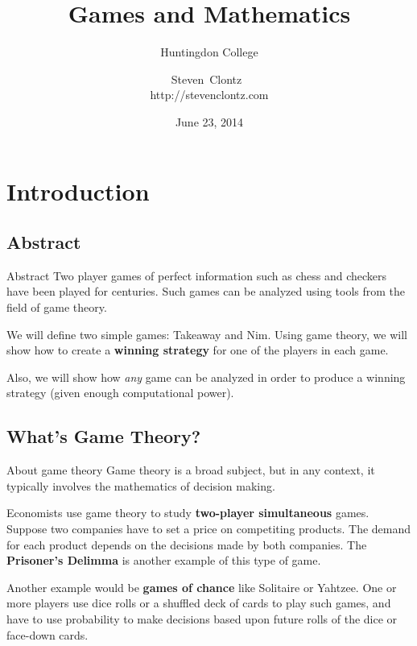 \documentclass{beamer}
\title
{Games and Mathematics}
\subtitle
{Huntingdon College} %
\author%
{Steven~Clontz~\\http://stevenclontz.com}%
\institute[Auburn University] %
{
  Department of Mathematics and Statistics\\
  Auburn University}
\date[14-06-23] %
{June 23, 2014}
\theoremstyle{theorem}
\theoremstyle{definition}
\newcommand{\<}{\langle}
\renewcommand{\>}{\rangle}
\newcommand{\vpause}{\pause\vspace{1em}}
\newcommand{\term}[1]{\textbf{#1}}
\begin{document}

\begin{frame}
  \titlepage
\end{frame}


\section{Introduction}

\subsection{Abstract}

\begin{frame}{Abstract}%
    \small
    Two player games of perfect information such as chess and checkers have
    been played for centuries. Such games can be analyzed using tools from
    the field of game theory.

    \vpause

    We will define two simple games: Takeaway and Nim.
    Using game theory, we will show how to create a \term{winning strategy}
    for one of the players in each game.

    \vpause

    Also, we will show how \textit{any} game can be analyzed in order
    to produce a winning strategy (given enough computational power).
\end{frame}

\subsection{What's Game Theory?}

\begin{frame}{About game theory}
  Game theory is a broad subject, but in any context, it typically involves the
  mathematics of decision making.

  \vpause

  Economists use game theory to study \term{two-player simultaneous}
  games. Suppose two companies have to set a price on competiting products.
  The demand for each product depends on the decisions made by both companies.
  The \term{Prisoner's Delimma} is another example of this type of game.

  \vpause

  Another example would be \term{games of chance} like Solitaire or Yahtzee.
  One or more players use dice rolls or a shuffled deck of cards to play such
  games, and have to use probability to make decisions based upon future rolls
  of the dice or face-down cards.
\end{frame}
\end{document}
